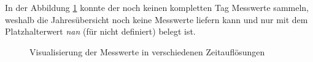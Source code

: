 In der Abbildung \ref{4times} konnte der  noch keinen kompletten Tag Messwerte sammeln, weshalb die Jahresübersicht noch keine Messwerte liefern kann und nur mit dem Platzhalterwert \textit{nan} (für nicht definiert) belegt ist.

\begin{figure}[ht]
	\centering
		\caption{Visualisierung der Messwerte in verschiedenen Zeitauflösungen}
		\label{4times}
\end{figure}

